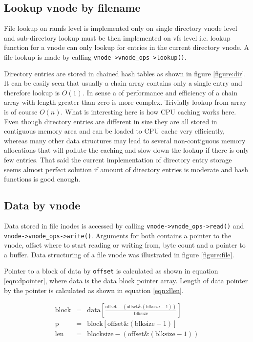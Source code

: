 \subsection{Lookup vnode by filename}

File lookup on ramfs level is implemented only on single directory vnode level
and sub-directory lookup must be then implemented on \acs{vfs} level i.e. lookup
function for a vnode can only lookup for entries in the current directory
vnode. A file lookup is made by calling \verb+vnode->vnode_ops->lookup()+.

Directory entries are stored in chained hash tables as shown in figure
\ref{figure:dir}. It can be easily seen that usually a chain array contains only
a single entry and therefore lookup is $O(1)$. In sense a of performance and
efficiency of a chain array with length greater than zero is more complex.
Trivially lookup from array is of course $O(n)$. What is interesting here is
how CPU caching works here. Even though directory entries are different in size
they are all stored in contiguous memory area and can be loaded to CPU cache
very efficiently, whereas many other data structures may lead to several
non-contiguous memory allocations that will pollute the caching and slow down
the lookup if there is only few entries. That said the current implementation of
directory entry storage seems almost perfect solution if amount of directory
entries is moderate and hash functions is good enough.\cite{Wikipedia:htable}

\subsection{Data by vnode}

Data stored in file inodes is accessed by calling
\verb+vnode->vnode_ops->read()+ and \verb+vnode->vnode_ops->write()+. Arguments
for both contains a pointer to the vnode, offset where to start reading or
writing from, byte count and a pointer to a buffer. Data structuring of a file
vnode was illustrated in figure \ref{figure:file}.

Pointer to a block of data by \verb+offset+ is calculated as shown in equation
\ref{eqn:dpointer}, where data is the data block pointer array. Length of
data pointer by the pointer is calculated as shown in equation \ref{eqn:dlen}.

\begin{eqnarray}
  \textrm{block} &=& \textrm{data} \left[ \frac{\textrm{offset} -
    (\textrm{offset} \& (\textrm{blksize} - 1))}{\textrm{blksize}}
    \right] \\
  \textrm{p}     &=& \textrm{block} \left[ \textrm{offset} \& (\textrm{blksize} - 1)
    \right] \label{eqn:dpointer} \\
  \textrm{len}  &=& \textrm{blocksize} - (\textrm{offset} \& (\textrm{blksize} - 1)) \label{eqn:dlen}
\end{eqnarray}

